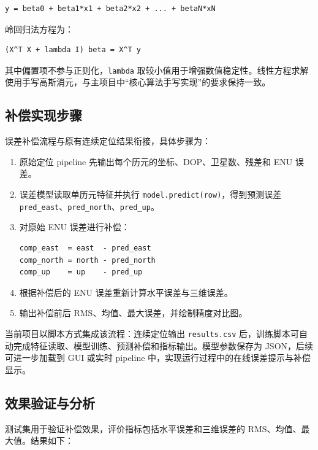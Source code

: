 \begin{verbatim}
y = beta0 + beta1*x1 + beta2*x2 + ... + betaN*xN
\end{verbatim}

岭回归法方程为：

\begin{verbatim}
(X^T X + lambda I) beta = X^T y
\end{verbatim}

其中偏置项不参与正则化，\texttt{lambda} 取较小值用于增强数值稳定性。线性方程求解使用手写高斯消元，与主项目中“核心算法手写实现”的要求保持一致。

\subsection{补偿实现步骤}

误差补偿流程与原有连续定位结果衔接，具体步骤为：

\begin{enumerate}
\item 原始定位 pipeline 先输出每个历元的坐标、DOP、卫星数、残差和 ENU 误差。
\item 误差模型读取单历元特征并执行 \texttt{model.predict(row)}，得到预测误差 \texttt{pred\_east}、\texttt{pred\_north}、\texttt{pred\_up}。
\item 对原始 ENU 误差进行补偿：
\begin{verbatim}
comp_east  = east  - pred_east
comp_north = north - pred_north
comp_up    = up    - pred_up
\end{verbatim}
\item 根据补偿后的 ENU 误差重新计算水平误差与三维误差。
\item 输出补偿前后 RMS、均值、最大误差，并绘制精度对比图。
\end{enumerate}

当前项目以脚本方式集成该流程：连续定位输出 \texttt{results.csv} 后，训练脚本可自动完成特征读取、模型训练、预测补偿和指标输出。模型参数保存为 JSON，后续可进一步加载到 GUI 或实时 pipeline 中，实现运行过程中的在线误差提示与补偿显示。

\subsection{效果验证与分析}

测试集用于验证补偿效果，评价指标包括水平误差和三维误差的 RMS、均值、最大值。结果如下：

